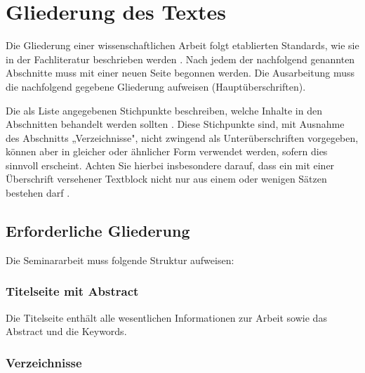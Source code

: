 
\chapter{Gliederung des Textes}
\label{chap:gliederung}

Die Gliederung einer wissenschaftlichen Arbeit folgt etablierten Standards, wie sie in der Fachliteratur beschrieben werden \parencite{ahrens2014,theisen2013}. Nach jedem der nachfolgend genannten Abschnitte muss mit einer neuen Seite begonnen werden. Die Ausarbeitung muss die nachfolgend gegebene Gliederung aufweisen (Hauptüberschriften).

Die als Liste angegebenen Stichpunkte beschreiben, welche Inhalte in den Abschnitten behandelt werden sollten \parencite{brunner2015}. Diese Stichpunkte sind, mit Ausnahme des Abschnitts „Verzeichnisse", nicht zwingend als Unterüberschriften vorgegeben, können aber in gleicher oder ähnlicher Form verwendet werden, sofern dies sinnvoll erscheint. Achten Sie hierbei insbesondere darauf, dass ein mit einer Überschrift versehener Textblock nicht nur aus einem oder wenigen Sätzen bestehen darf \parencite{wagner2007}.

\section{Erforderliche Gliederung}
\label{sec:erforderliche_gliederung}

Die Seminararbeit muss folgende Struktur aufweisen:

\subsection*{Titelseite mit Abstract}
\label{subsec:titelseite}

Die Titelseite enthält alle wesentlichen Informationen zur Arbeit sowie das Abstract und die Keywords.

\subsection*{Verzeichnisse}
\label{subsec:verzeichnisse}

